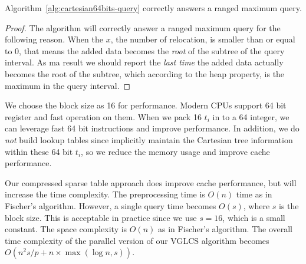 



\begin{theorem} \label{thm:correctness}
  Algorithm~\ref{alg:cartesian64bits-query} correctly answers a ranged
  maximum query.
\end{theorem}
\begin{proof}
The algorithm will correctly answer a ranged maximum query for the
following reason.  When the $x$, the number of relocation, is smaller
than or equal to 0, that means the added data becomes the {\em root} of
the subtree of the query interval.  As ma result we should report the
{\em last time} the added data actually becomes the root of the
subtree, which according to the heap property, is the maximum in the
query interval.
\end{proof}

We choose the block size as 16 for performance.  Modern CPUs support
64 bit register and fast operation on them.  When we pack 16 $t_i$ in
to a 64 integer, we can leverage fast 64 bit instructions and improve
performance.  In addition, we do {\em not} build lookup tables since
implicitly maintain the Cartesian tree information within these 64
bit $t_i$, so we reduce the memory usage and improve cache
performance.

Our compressed sparse table approach does improve cache performance,
but will increase the time complexity.  The preprocessing time is
$O(n)$ time as in Fischer's algorithm.  However, a single query time
becomes $O(s)$, where $s$ is the block size.  This is acceptable in
practice since we use $s = 16$, which is a small constant.  The space
complexity is $O(n)$ as in Fischer's algorithm.  The overall time
complexity of the parallel version of our VGLCS algorithm becomes
$O(n^2 s / p + n \times \max(\log n, s))$.
